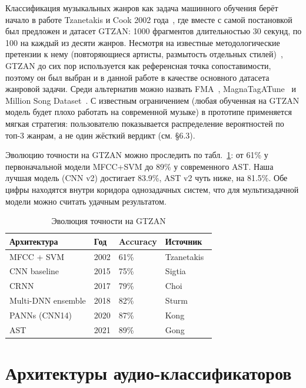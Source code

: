 Классификация музыкальных жанров как задача машинного обучения берёт начало в работе Tzanetakis и Cook 2002 года~\cite{tzanetakis2002gtzan}, где вместе с самой постановкой был предложен и датасет GTZAN: 1000 фрагментов длительностью 30 секунд, по 100 на каждый из десяти жанров. Несмотря на известные методологические претензии к нему (повторяющиеся артисты, размытость отдельных стилей)~\cite{sturm2014state}, GTZAN до сих пор используется как референсная точка сопоставимости, поэтому он был выбран и в данной работе в качестве основного датасета жанровой задачи. Среди альтернатив можно назвать FMA~\cite{defferrard2017fma}, MagnaTagATune~\cite{law2009magnatagatune} и Million Song Dataset~\cite{bertinmahieux2011msd}. С известным ограничением (любая обученная на GTZAN модель будет плохо работать на современной музыке) в прототипе применяется мягкая стратегия: пользователю показывается распределение вероятностей по топ-3 жанрам, а не один жёсткий вердикт (см. §6.3).

Эволюцию точности на GTZAN можно проследить по табл.~\ref{tab:gtzan-sota}: от 61\% у первоначальной модели MFCC+SVM до 89\% у современного AST. Наша лучшая модель (CNN v2) достигает 83.9\%, AST v2 чуть ниже, на 81.5\%. Обе цифры находятся внутри коридора однозадачных систем, что для мультизадачной модели можно считать удачным результатом.

\begin{table}[H]
\centering
\caption{Эволюция точности на GTZAN}
\label{tab:gtzan-sota}
\begin{tabular}{llll}
\toprule
Архитектура & Год & Accuracy & Источник \\
\midrule
MFCC + SVM & 2002 & 61\% & Tzanetakis~\cite{tzanetakis2002gtzan} \\
CNN baseline & 2015 & 75\% & Sigtia~\cite{sigtia2014improved} \\
CRNN & 2017 & 79\% & Choi~\cite{choi2017crnn} \\
Multi-DNN ensemble & 2018 & 82\% & Sturm~\cite{sturm2014state} \\
PANNs (CNN14) & 2020 & 87\% & Kong~\cite{kong2020panns} \\
AST & 2021 & 89\% & Gong~\cite{gong2021ast} \\
\bottomrule
\end{tabular}
\end{table}

\section{Архитектуры аудио-классификаторов}\label{sec:1-5}

